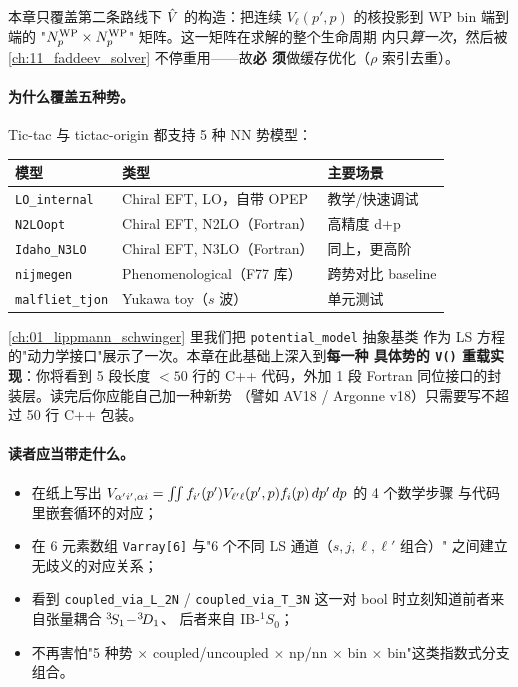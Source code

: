 本章只覆盖第二条路线下 \(\hat{V}\) 的构造：把连续 \(V_\ell(p', p)\) 的核投影到
WP bin 端到端的 "\({N_{p}^{\text{WP}}} \times {N_{p}^{\text{WP}}}\)" 矩阵。这一矩阵在求解的整个生命周期
内只\emph{算一次}，然后被 \cref{ch:11_faddeev_solver} 不停重用——故\textbf{必
须}做缓存优化（\(\rho\) 索引去重）。

\paragraph{为什么覆盖五种势。}
Tic-tac 与 tictac-origin 都支持 5 种 NN 势模型：

\begin{center}
\begin{tabular}{lll}
\toprule
模型 & 类型 & 主要场景 \\
\midrule
\texttt{LO\_internal} & Chiral EFT, LO，自带 OPEP & 教学/快速调试 \\
\texttt{N2LOopt}      & Chiral EFT, N2LO（Fortran） & 高精度 d+p \\
\texttt{Idaho\_N3LO}  & Chiral EFT, N3LO（Fortran） & 同上，更高阶 \\
\texttt{nijmegen}     & Phenomenological（F77 库） & 跨势对比 baseline \\
\texttt{malfliet\_tjon} & Yukawa toy（\(s\) 波） & 单元测试 \\
\bottomrule
\end{tabular}
\end{center}

\cref{ch:01_lippmann_schwinger} 里我们把 \texttt{potential\_model} 抽象基类
作为 LS 方程的"动力学接口"展示了一次。本章在此基础上深入到\textbf{每一种
具体势的 \texttt{V()} 重载实现}：你将看到 5 段长度 \(< 50\) 行的
C++ 代码，外加 1 段 Fortran 同位接口的封装层。读完后你应能自己加一种新势
（譬如 AV18 / Argonne v18）只需要写不超过 50 行 C++ 包装。

\paragraph{读者应当带走什么。}
\begin{itemize}
  \item 在纸上写出 \(V_{\alpha' i', \alpha i} =
        \int\!\!\int f_{i'}(p') V_{\ell'\ell}(p', p) f_i(p)\, dp'\, dp\) 的 4 个数学步骤
        与代码里嵌套循环的对应；
  \item 在 6 元素数组 \texttt{Varray[6]} 与"6 个不同 LS 通道（\(s, j, \ell, \ell'\) 组合）"
        之间建立无歧义的对应关系；
  \item 看到 \texttt{coupled\_via\_L\_2N} / \texttt{coupled\_via\_T\_3N} 这一对
        bool 时立刻知道前者来自张量耦合 \({}^{3}\!S_{1}\!-\!{}^{3}\!D_{1}\)、
        后者来自 IB-\({}^1S_0\)；
  \item 不再害怕"5 种势 \(\times\) coupled/uncoupled \(\times\) np/nn \(\times\)
        bin × bin"这类指数式分支组合。
\end{itemize}

